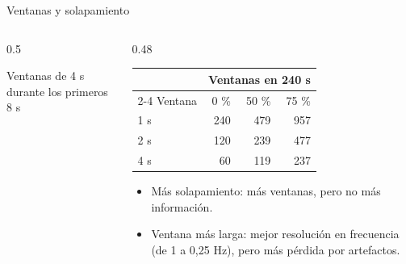 \documentclass[aspectratio=169,11pt]{beamer}
\begin{document}
\begin{frame}{Ventanas y solapamiento}
  \begin{columns}[c]
    \begin{column}{0.5\textwidth}
      \centering

      {\scriptsize Ventanas de 4 s durante los primeros 8 s}
    \end{column}
    \begin{column}{0.48\textwidth}
      \footnotesize
      \centering
      \begin{tabular}{@{}lrrr@{}}
        \toprule
         & \multicolumn{3}{c}{Ventanas en 240 s} \\
        \cmidrule(l){2-4}
        Ventana & 0 \% & 50 \% & 75 \% \\
        \midrule
        1 s & 240 & 479 & 957 \\
        2 s & 120 & 239 & 477 \\
        4 s & 60 & 119 & 237 \\
        \bottomrule
      \end{tabular}

      \vspace{3mm}
      \begin{itemize}
        \item Más solapamiento: más ventanas, pero \alert{no más información}.
        \item Ventana más larga: mejor resolución en frecuencia (de 1 a 0,25 Hz), pero más pérdida por artefactos.
      \end{itemize}
    \end{column}
  \end{columns}
\end{frame}
\end{document}
